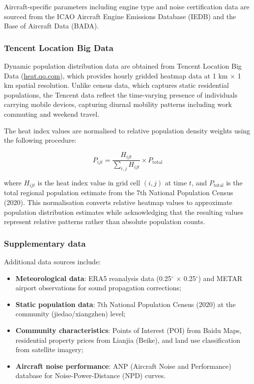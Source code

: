 \documentclass[review,12pt]{elsarticle}
\begin{document}
Aircraft-specific parameters including engine type and noise certification data are sourced from the ICAO Aircraft Engine Emissions Database (IEDB) and the Base of Aircraft Data (BADA).

\subsubsection{Tencent Location Big Data}

Dynamic population distribution data are obtained from Tencent Location Big Data (\url{heat.qq.com}), which provides hourly gridded heatmap data at 1 km $\times$ 1 km spatial resolution. Unlike census data, which captures static residential populations, the Tencent data reflect the time-varying presence of individuals carrying mobile devices, capturing diurnal mobility patterns including work commuting and weekend travel.

The heat index values are normalised to relative population density weights using the following procedure:

\[
P_{ijt} = \frac{H_{ijt}}{\sum_{i,j} H_{ijt}} \times P_{\text{total}}
\]

where $H_{ijt}$ is the heat index value in grid cell $(i,j)$ at time $t$, and $P_{\text{total}}$ is the total regional population estimate from the 7th National Population Census (2020). This normalisation converts relative heatmap values to approximate population distribution estimates while acknowledging that the resulting values represent relative patterns rather than absolute population counts.

\subsubsection{Supplementary data}

Additional data sources include:
\begin{itemize}[noitemsep]
    \item \textbf{Meteorological data}: ERA5 reanalysis data (0.25$^\circ$ $\times$ 0.25$^\circ$) and METAR airport observations for sound propagation corrections;
    \item \textbf{Static population data}: 7th National Population Census (2020) at the community (jiedao/xiangzhen) level;
    \item \textbf{Community characteristics}: Points of Interest (POI) from Baidu Maps, residential property prices from Lianjia (Beike), and land use classification from satellite imagery;
    \item \textbf{Aircraft noise performance}: ANP (Aircraft Noise and Performance) database for Noise-Power-Distance (NPD) curves.
\end{itemize}
\end{document}
